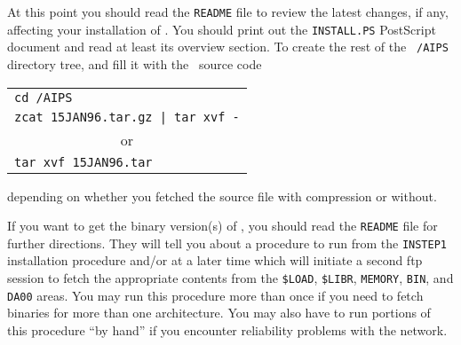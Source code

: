 At this point you should read the {\tt README} file to review the
latest changes, if any, affecting your installation of \hbox{\AIPS}.
You should print out the {\tt INSTALL.PS} PostScript document and
read at least its overview section.  To create the rest of the {\tt
/AIPS} directory tree, and fill it with the \AIPS\ source code
\vskip -10pt
\begin{center}
\begin{tabular}{l}
   {\tt cd /AIPS} \\
   {\tt zcat 15JAN96.tar.gz | tar xvf -} \\
\multicolumn{1}{c}{or} \\
   {\tt tar xvf 15JAN96.tar}
\end{tabular}
\end{center}
\vskip -10pt
depending on whether you fetched the source file with compression or
without.

If you want to get the binary version(s) of \AIPS, you should read the
{\tt README} file for further directions.  They will tell you about a
procedure to run from the {\tt INSTEP1} installation procedure and/or
at a later time which will initiate a second ftp session to fetch the
appropriate contents from the {\tt \$LOAD}, {\tt \$LIBR}, {\tt MEMORY},
{\tt BIN}, and {\tt DA00} areas.  You may run this procedure more than
once if you need to fetch binaries for more than one architecture.
You may also have to run portions of this procedure ``by hand'' if you
encounter reliability problems with the network.

